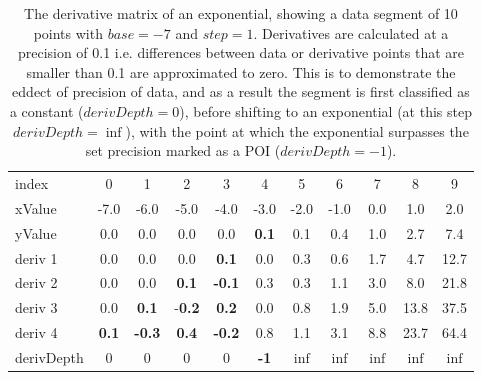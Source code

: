 \documentclass[main.tex]{subfiles}
\begin{document}
  
  \begin{table}[h]
    \caption{The derivative matrix of an exponential, showing a data segment of 10 points with $base=-7$ and $step=1$. Derivatives are calculated at a precision of 0.1 i.e. differences between data or derivative points that are smaller than 0.1 are approximated to zero. This is to demonstrate the eddect of precision of data, and as a result the segment is first classified as a constant ($derivDepth=0$), before shifting to an exponential (at this step $derivDepth=\inf$), with the point at which the exponential surpasses the set precision marked as a POI ($derivDepth=-1$).}
    \centering
    \begin{tabularx}{0.85\textwidth}{ X | c c c c c c c c c c }
      index & 0 & 1 & 2 & 3 & 4 & 5 & 6 & 7 & 8 & 9 \\
      xValue & -7.0 & -6.0 & -5.0 & -4.0 & -3.0 & -2.0 & -1.0 & 0.0 & 1.0 & 2.0 \\
      \hline \hline
      yValue & 0.0 & 0.0 & 0.0 & 0.0 & \textbf{0.1} & 0.1 & 0.4 &  1.0 & 2.7 & 7.4 \\
      \hline
      deriv 1 & 0.0 & 0.0 & 0.0 & \textbf{0.1} & 0.0 & 0.3 & 0.6 & 1.7 & 4.7 & 12.7 \\
      deriv 2 & 0.0 & 0.0 & \textbf{0.1} & \textbf{-0.1} & 0.3 & 0.3 & 1.1 & 3.0 & 8.0 & 21.8 \\
      deriv 3 & 0.0 & \textbf{0.1} & -\textbf{0.2} & \textbf{0.2} & 0.0 & 0.8 & 1.9 & 5.0 & 13.8 & 37.5 \\   
      deriv 4 & \textbf{0.1} & \textbf{-0.3} & \textbf{0.4} & \textbf{-0.2} & 0.8 & 1.1 & 3.1 & 8.8 & 23.7 & 64.4 \\  
      \hline
      derivDepth & 0 & 0 & 0 & 0 & \textbf{-1} & $\inf$ & $\inf$ & $\inf$ & $\inf$ & $\inf$ \\   
    \end{tabularx}
    \label{tbl:mtrx:exp}
  \end{table}
\end{document}
